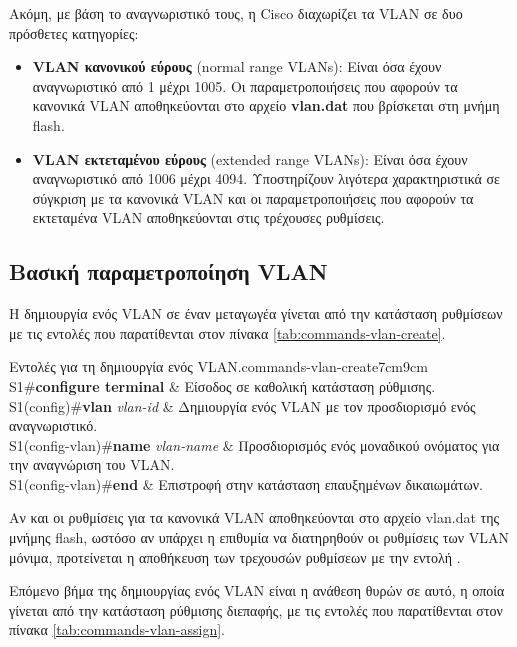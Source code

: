 \documentclass{EdipyLabs} %
\begin{document}
Ακόμη, με βάση το αναγνωριστικό τους, η Cisco διαχωρίζει τα VLAN σε δυο πρόσθετες κατηγορίες:
\begin{itemize}
	\item \textbf{VLAN κανονικού εύρους} (normal range VLANs): Είναι όσα έχουν αναγνωριστικό από 1 μέχρι 1005. Οι παραμετροποιήσεις που αφορούν τα κανονικά VLAN αποθηκεύονται στο αρχείο \textbf{vlan.dat} που βρίσκεται στη μνήμη flash.
	\item \textbf{VLAN εκτεταμένου εύρους} (extended range VLANs): Είναι όσα έχουν αναγνωριστικό από 1006 μέχρι 4094. Υποστηρίζουν λιγότερα χαρακτηριστικά σε σύγκριση με τα κανονικά VLAN και οι παραμετροποιήσεις που αφορούν τα εκτεταμένα VLAN αποθηκεύονται στις τρέχουσες ρυθμίσεις. 
\end{itemize}

\subsection{Βασική παραμετροποίηση VLAN}

Η δημιουργία ενός VLAN σε έναν μεταγωγέα γίνεται από την κατάσταση ρυθμίσεων με τις εντολές που παρατίθενται στον πίνακα \ref{tab:commands-vlan-create}.

\begin{CommandTable*}{Εντολές για τη δημιουργία ενός VLAN.}{commands-vlan-create}{7cm}{9cm}
	S1\#\textbf{configure terminal} & Είσοδος σε καθολική κατάσταση ρύθμισης.\\
	S1(config)\#\textbf{vlan} \textit{vlan-id}  & Δημιουργία ενός VLAN με τον προσδιορισμό ενός αναγνωριστικό.\\
	S1(config-vlan)\#\textbf{name} \textit{vlan-name} & Προσδιορισμός ενός μοναδικού ονόματος για την αναγνώριση του VLAN.\\
	S1(config-vlan)\#\textbf{end} & Επιστροφή στην κατάσταση επαυξημένων δικαιωμάτων.
\end{CommandTable*}

Αν και οι ρυθμίσεις για τα κανονικά VLAN αποθηκεύονται στο αρχείο vlan.dat της μνήμης flash, ωστόσο αν υπάρχει η επιθυμία να διατηρηθούν οι ρυθμίσεις των VLAN μόνιμα, προτείνεται η αποθήκευση των τρεχουσών ρυθμίσεων με την εντολή . 

Επόμενο βήμα της δημιουργίας ενός VLAN είναι η ανάθεση θυρών σε αυτό, η οποία γίνεται από την κατάσταση ρύθμισης διεπαφής, με τις εντολές που παρατίθενται στον πίνακα \ref{tab:commands-vlan-assign}.
\end{document}
